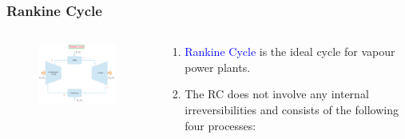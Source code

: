 \documentclass[10pt,compress]{beamer}
\begin{document}
\begin{frame}
 \frametitle{Rankine Cycle}
 \begin{columns}
   \begin{column}[c]{0.6\linewidth}
    \begin{figure}%
     \begin{center}
      \includegraphics[width=7.5cm,clip]{./Pics/Simple_Rankine_Cycle}
     \end{center}
    \end{figure}  
   \end{column}
   \begin{column}[l]{0.4\linewidth}
    \begin{enumerate}
     \item <1->\textcolor{blue}{Rankine Cycle} is the ideal cycle for vapour power plants.
     \item <2-> The RC does not involve any internal irreversibilities and consists of the following four processes:
    \end{enumerate}
   \end{column}
  \end{columns}
 \normalsize
\end{frame}
\end{document}
